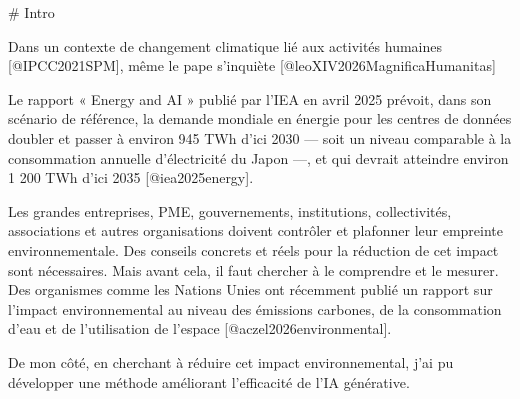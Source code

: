 # Intro

Dans un contexte de changement climatique lié aux activités humaines [@IPCC2021SPM], même le pape s'inquiète [@leoXIV2026MagnificaHumanitas]

Le rapport « Energy and AI » publié par l’IEA en avril 2025 prévoit, dans son scénario de référence, la demande mondiale en énergie pour les centres de données doubler et passer à environ 945 TWh d’ici 2030 — soit un niveau comparable à la consommation annuelle d’électricité du Japon —, et qui devrait atteindre environ 1 200 TWh d’ici 2035 [@iea2025energy].

Les grandes entreprises, PME, gouvernements, institutions, collectivités, associations et autres organisations doivent contrôler et plafonner leur empreinte environnementale. Des conseils concrets et réels pour la réduction de cet impact sont nécessaires. Mais avant cela, il faut chercher à le comprendre et le mesurer.
Des organismes comme les Nations Unies ont récemment publié un rapport sur l'impact environnemental au niveau des émissions carbones, de la consommation d'eau et de l'utilisation de l'espace [@aczel2026environmental].

De mon côté, en cherchant à réduire cet impact environnemental, j’ai pu développer une méthode améliorant l'efficacité de l'IA générative.

